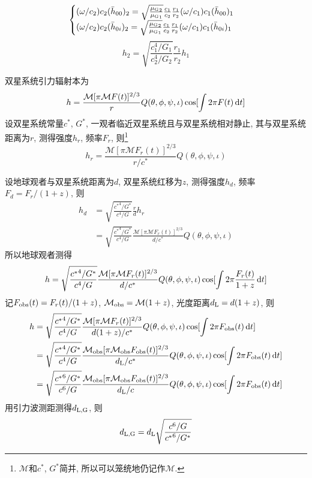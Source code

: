 \begin{equation}
    \begin{cases}
        (\omega/c_2)c_2(\bar{h}_{00})_2=\sqrt{\frac{{\mu_{\text{G}}}_2}{{\mu_{\text{G}}}_1}}\frac{c_1}{c_2}\frac{r_1}{r_2}(\omega/c_1)c_1(\bar{h}_{00})_1\\
        (\omega/c_2)c_2(\bar{h}_{0i})_2=\sqrt{\frac{{\mu_{\text{G}}}_2}{{\mu_{\text{G}}}_1}}\frac{c_1}{c_2}\frac{r_1}{r_2}(\omega/c_1)c_1(\bar{h}_{0i})_1
    \end{cases}
\end{equation}
\begin{equation}
    h_2=\sqrt{\frac{c_1^4/G_1}{c_2^4/G_2}}\frac{r_1}{r_2}h_1
\end{equation}

双星系统引力辐射本为
\begin{equation}
    h=\frac{\mathcal{M}[\pi \mathcal{M}F(t)]^{2/3}}{r}Q(\theta,\phi,\psi,\iota)\cos[\int 2\pi F(t)\,\mathrm{d} t]
\end{equation}
设双星系统常量$c^*$, $G^*$, 一观者临近双星系统且与双星系统相对静止, 其与双星系统距离为$r$, 测得强度$h_r$, 频率$F_r$, 则\footnote{$\mathcal{M}$和$c^*$, $G^*$简并, 所以可以笼统地仍记作$\mathcal{M}$.}
\begin{equation}
    h_r=\frac{\mathcal{M}[\pi \mathcal{M}F_r(t)]^{2/3}}{r/c^*}Q(\theta,\phi,\psi,\iota)
\end{equation}

设地球观者与双星系统距离为$d$, 双星系统红移为$z$, 测得强度$h_d$, 频率$F_d=F_r/(1+z)$, 则
\begin{align}
    h_d&=\sqrt{\frac{{c^*}^4/G^*}{c^4/G}}\frac{r}{d}h_r\\
    &=\sqrt{\frac{{c^*}^4/G^*}{c^4/G}}\frac{\mathcal{M}[\pi \mathcal{M}F_r(t)]^{2/3}}{d/c^*}Q(\theta,\phi,\psi,\iota)
\end{align}
所以地球观者测得
\begin{equation}
    h=\sqrt{\frac{{c^*}^4/G^*}{c^4/G}}\frac{\mathcal{M}[\pi \mathcal{M}F_r(t)]^{2/3}}{d/c^*}Q(\theta,\phi,\psi,\iota)\cos[\int 2\pi \frac{F_r(t)}{1+z}\,\mathrm{d} t]
\end{equation}
记$F_\text{obs}(t)=F_r(t)/(1+z)$, $\mathcal{M}_\text{obs}=\mathcal{M}(1+z)$, 光度距离$d_\text{L}=d(1+z)$, 则
\begin{align}
    h&=\sqrt{\frac{{c^*}^4/G^*}{c^4/G}}\frac{\mathcal{M}[\pi \mathcal{M}F_r(t)]^{2/3}}{d(1+z)/c^*}Q(\theta,\phi,\psi,\iota)\cos[\int 2\pi F_\text{obs}(t)\,\mathrm{d} t]\\
    &=\sqrt{\frac{{c^*}^4/G^*}{c^4/G}}\frac{\mathcal{M}_\text{obs}[\pi \mathcal{M}_\text{obs}F_\text{obs}(t)]^{2/3}}{d_\text{L}/c^*}Q(\theta,\phi,\psi,\iota)\cos[\int 2\pi F_\text{obs}(t)\,\mathrm{d} t]\\
    &=\sqrt{\frac{{c^*}^6/G^*}{c^6/G}}\frac{\mathcal{M}_\text{obs}[\pi \mathcal{M}_\text{obs}F_\text{obs}(t)]^{2/3}}{d_\text{L}/c}Q(\theta,\phi,\psi,\iota)\cos[\int 2\pi F_\text{obs}(t)\,\mathrm{d} t]
\end{align}
用引力波测距测得$d_\text{L,G}$, 则
\begin{equation}
    d_\text{L,G}=d_\text{L}\sqrt{\frac{c^6/G}{{c^*}^6/G^*}}
\end{equation}

